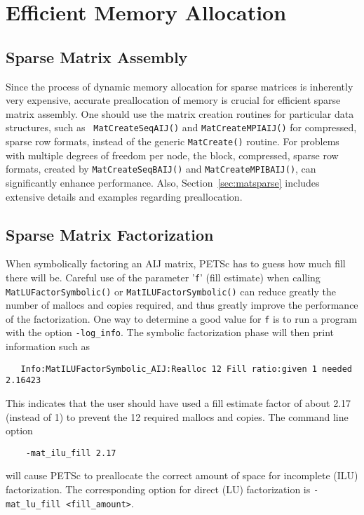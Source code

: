 \section{Efficient Memory Allocation}
\label{sec:perf:memory}

\subsection{Sparse Matrix Assembly}

Since the process of dynamic memory allocation for sparse matrices is
inherently very expensive, accurate preallocation of memory is crucial
for efficient sparse matrix assembly.  One should use the matrix creation
routines for particular data structures, such as {\tt
MatCreateSeqAIJ()} and {\tt MatCreateMPIAIJ()} for compressed, sparse
row formats, instead of the generic {\tt MatCreate()} routine.  For
problems with multiple degrees of freedom per node, the block,
compressed, sparse row formats, created by {\tt MatCreateSeqBAIJ()}
and {\tt MatCreateMPIBAIJ()}, can significantly enhance performance.
Also, Section~\ref{sec:matsparse} includes extensive details and
examples regarding preallocation.

\subsection{Sparse Matrix Factorization}
\label{sec:symbolfactor}

When symbolically factoring an AIJ matrix, PETSc has to guess
how much fill there will be.  Careful use of the parameter '{\tt f}' (fill
estimate) when calling {\tt MatLUFactorSymbolic()} or {\tt MatILUFactorSymbolic()}
can reduce greatly the number of mallocs and copies required, and thus
greatly improve the performance of the factorization.  One way to
determine a good value for {\tt f} is to run a program with the option {\tt -log\_info}.
The symbolic factorization phase will then print information such as
\begin{verbatim}
   Info:MatILUFactorSymbolic_AIJ:Realloc 12 Fill ratio:given 1 needed 2.16423
\end{verbatim}
This indicates that the user should have used a fill estimate factor of
about 2.17 (instead of 1) to prevent the 12 required mallocs and copies.
The command line option 
\begin{verbatim}
    -mat_ilu_fill 2.17
\end{verbatim}
will cause PETSc to preallocate the correct amount of space for incomplete
(ILU) factorization.  The corresponding option for direct (LU) factorization
is {\tt -mat\_lu\_fill <fill\_amount>}.

